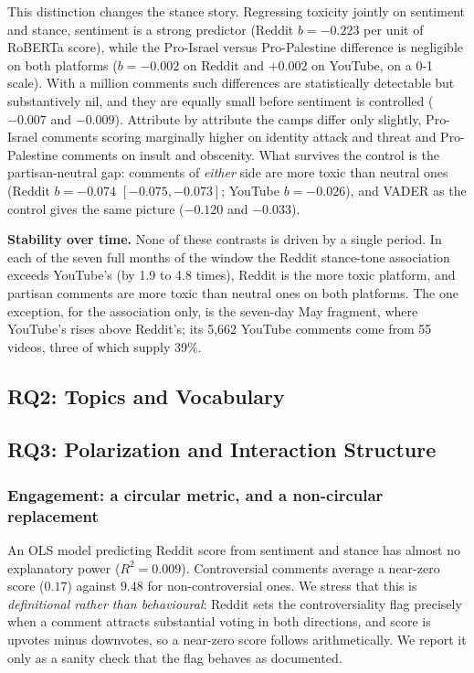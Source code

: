 This distinction changes the stance story. Regressing toxicity jointly on sentiment
and stance, sentiment is a strong predictor (Reddit $b=-0.223$ per unit of RoBERTa
score), while the Pro-Israel versus Pro-Palestine difference is negligible on both
platforms ($b=-0.002$ on Reddit and $+0.002$ on YouTube, on a 0-1 scale). With a
million comments such differences are statistically detectable but substantively
nil, and they are equally small before sentiment is controlled ($-0.007$ and
$-0.009$). Attribute by attribute the camps differ only slightly, Pro-Israel
comments scoring marginally higher on identity attack and threat and Pro-Palestine
comments on insult and obscenity. What survives the control is the partisan-neutral
gap: comments of \emph{either} side are more toxic than neutral ones (Reddit
$b=-0.074$ $[-0.075, -0.073]$; YouTube $b=-0.026$), and VADER as the control gives
the same picture ($-0.120$ and $-0.033$).

\textbf{Stability over time.} None of these contrasts is driven by a single period.
In each of the seven full months of the window the Reddit stance-tone association
exceeds YouTube's (by 1.9 to 4.8 times), Reddit is the more toxic platform, and
partisan comments are more toxic than neutral ones on both platforms. The one
exception, for the association only, is the seven-day May fragment, where YouTube's
rises above Reddit's; its 5{,}662 YouTube comments come from 55 videos, three of
which supply 39\%.

\subsection{RQ2: Topics and Vocabulary}


\subsection{RQ3: Polarization and Interaction Structure}

\subsubsection*{Engagement: a circular metric, and a non-circular replacement}
An OLS model predicting Reddit score from sentiment and stance has almost no
explanatory power ($R^2=0.009$). Controversial comments average a near-zero score
($0.17$) against $9.48$ for non-controversial ones. We stress that this is
\emph{definitional rather than behavioural}: Reddit sets the controversiality flag
precisely when a comment attracts substantial voting in both directions, and score is
upvotes minus downvotes, so a near-zero score follows arithmetically. We report it
only as a sanity check that the flag behaves as documented.

